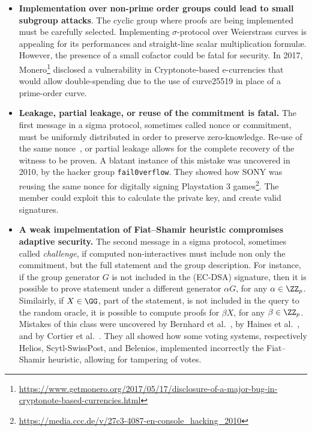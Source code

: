 \documentclass[runningheads]{llncs}
\begin{document}
\begin{itemize}
  \item \textbf{Implementation over non-prime order groups could lead to small subgroup attacks}. The cyclic group where proofs are being implemented must be carefully selected. Implementing $\sigma$-protocol over Weierstrass curves is appealing for its performances and straight-line scalar multiplication formul\ae.
   However, the presence of a small cofactor could be fatal for security.
In 2017, Monero\footnote{\url{https://www.getmonero.org/2017/05/17/disclosure-of-a-major-bug-in-cryptonote-based-currencies.html}} disclosed a vulnerability in Cryptonote-based e-currencies that would allow double-spending
due to the use of curve25519 in place of a prime-order curve.
  \item \textbf{Leakage, partial leakage, or reuse of the commitment is fatal.}
  The first message in a sigma protocol, sometimes called nonce or commitment, must be uniformly distributed in order to preserve zero-knowledge. Re-use of the same nonce~\cite{XX}, or partial leakage allows for the complete recovery of the witness to be proven.
  A blatant instance of this mistake was uncovered in 2010, by the hacker group \texttt{fail0verflow}. They showed how SONY was reusing the same nonce for digitally signing Playstation 3 games\footnote{\url{https://media.ccc.de/v/27c3-4087-en-console_hacking_2010}}.  The member could exploit this to calculate the private key, and create valid signatures.

  \item \textbf{A weak impelmentation of Fiat--Shamir heuristic compromises adaptive security.} The second message in a sigma protocol, sometimes called \emph{challenge}, if computed non-interactives must include non only the commitment, but the full statement and the group description. For instance, if the group generator $G$ is not included in the (EC-DSA) signature, then it is possible to prove statement under a different generator $\alpha G$, for any $\alpha \in \ZZ_p$.
  Similairly, if $X \in \GG$, part of the statement, is not included in the query to the random oracle, it is possible to compute proofs for $\beta X$, for any $\beta \in \ZZ_p$.
  Mistakes of this class were uncovered by Bernhard et al.~\cite{AC:BerPerWar12}, by Haines et al.~\cite{SP:HLPT20}, and by Cortier et al.~\cite{cortier2020}.
  They all showed how some voting systems, respectively Helios,  Scytl-SwissPost, and Belenios,
  implemented incorrectly the Fiat--Shamir heuristic, allowing for tampering of votes.

\end{itemize}
\end{document}

